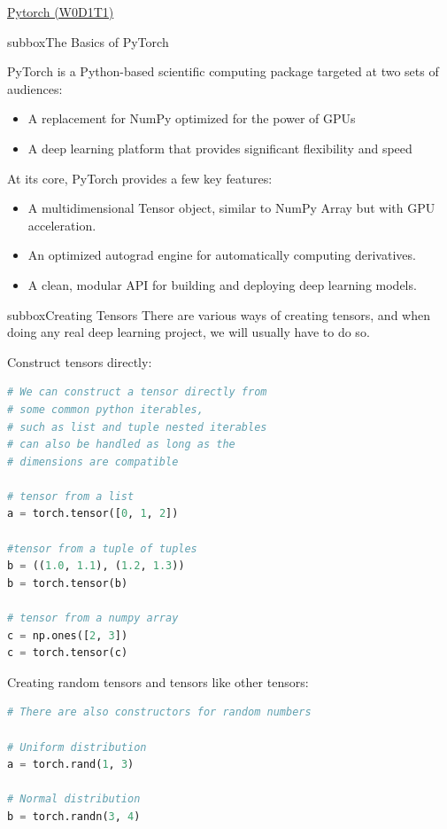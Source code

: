 \begin{multicols}{3}
\begin{textbox}{\href{https://deeplearning.neuromatch.io/tutorials/W1D1_BasicsAndPytorch/student/W1D1_Tutorial1.html}{Pytorch (W0D1T1) }}
\begin{subbox}{subbox}{The Basics of PyTorch}
\scriptsize


PyTorch is a Python-based scientific computing package targeted at two sets of audiences:
\begin{itemize}
    \item 
A replacement for NumPy optimized for the power of GPUs
    \item A deep learning platform that provides significant flexibility and speed
\end{itemize}
At its core, PyTorch provides a few key features:

\begin{itemize}
    \item A multidimensional Tensor object, similar to NumPy Array but with GPU acceleration.
    \item An optimized autograd engine for automatically computing derivatives.
    \item A clean, modular API for building and deploying deep learning models.
\end{itemize}



\end{subbox}
\begin{subbox}{subbox}{Creating Tensors}
\scriptsize
There are various ways of creating tensors, and when doing any real deep learning project, we will usually have to do so.

Construct tensors directly:

\begin{lstlisting}[language=Python]
# We can construct a tensor directly from 
# some common python iterables,
# such as list and tuple nested iterables 
# can also be handled as long as the
# dimensions are compatible

# tensor from a list
a = torch.tensor([0, 1, 2])

#tensor from a tuple of tuples
b = ((1.0, 1.1), (1.2, 1.3))
b = torch.tensor(b)

# tensor from a numpy array
c = np.ones([2, 3])
c = torch.tensor(c)
\end{lstlisting}
Creating random tensors and tensors like other tensors:
\begin{lstlisting}[language=Python]
# There are also constructors for random numbers

# Uniform distribution
a = torch.rand(1, 3)

# Normal distribution
b = torch.randn(3, 4)
\end{lstlisting}
\end{subbox}
\end{textbox}
\end{multicols}
